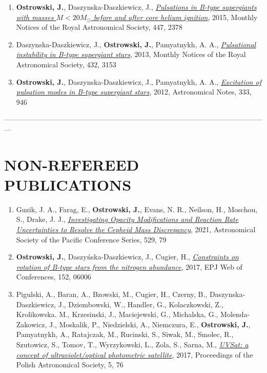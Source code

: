 \documentclass[margin, 10pt]{res} %
\begin{document}
\begin{resume}
\begin{enumerate}
    \item \textbf{Ostrowski, J.}, Daszynska-Daszkiewicz, J., \href{http://adsabs.harvard.edu/abs/2015MNRAS.447.2378O}{\textit{Pulsations in B-type supergiants with masses $M < 20 M_\odot$ before and after core helium ignition}}, 2015, Monthly Notices of the Royal Astronomical Society, 447, 2378

    \item Daszynska-Daszkiewicz, J.,\textbf{ Ostrowski, J.}, Pamyatnykh, A. A., \href{http://adsabs.harvard.edu/abs/2013MNRAS.432.3153D}{\textit{Pulsational instability in B-type supergiant stars}}, 2013, Monthly Notices of the Royal Astronomical Society, 432, 3153

    \item \textbf{Ostrowski, J.}, Daszynska-Daszkiewicz, J., Pamyatnykh, A. A., \href{http://adsabs.harvard.edu/abs/2012AN....333..946O}{\textit{Excitation of pulsation modes in B-type supergiant stars}}, 2012, Astronomical Notes, 333, 946
\end{enumerate}

---------------------------------------------------------------------------------------------------------------

\section{NON-REFEREED \\ PUBLICATIONS} 

\begin{enumerate}

    \item Guzik, J. A., Farag, E., \textbf{Ostrowski, J.}, Evans, N. R., Neilson, H., Moschou, S., Drake, J. J., \href{https://ui.adsabs.harvard.edu/abs/2021ASPC..529...79G/abstract}{\textit{Investigating Opacity Modifications and Reaction Rate Uncertainties to Resolve the Cepheid Mass Discrepancy}}, 2021, Astronomical Society of the Pacific Conference Series, 529, 79

    \item \textbf{Ostrowski, J.}, Daszy\'{n}ska-Daszkiewicz, J., Cugier, H., \href{http://adsabs.harvard.edu/abs/2017EPJWC.15206006O}{\textit{Constraints on rotation of B-type stars from the nitrogen abundance}}, 2017, EPJ Web of Conferences, 152, 06006

    \item Pigulski, A., Baran, A., Bzowski, M., Cugier, H., Czerny, B., Daszynska-Daszkiewicz, J., Dziembowski, W.,  Handler, G., Kolaczkowski, Z., Krolikowska. M., Krzesinski, J., Maciejewski, G., Michalska, G., Molenda-Zakowicz, J., Moskalik, P., Niedzielski, A., Niemczura, E., \textbf{Ostrowski, J.}, Pamyatnykh, A., Ratajczak, M., Rucinski, S., Siwak, M., Smolec, R., Szutowicz, S., Tomov, T., Wyrzykowski, L., Zola, S., Sarna, M., \href{http://adsabs.harvard.edu/abs/2017sbcs.conf...76P}{\textit{UVSat: a concept of ultraviolet/optical photometric satellite}}, 2017, Proceedings of the Polish Astronomical Society, 5, 76


\end{enumerate}
\end{resume}
\end{document}
